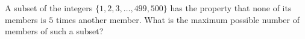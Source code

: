 A subset of the integers $\{1,2,3,\dots,499,500\}$ has the property that none of its members is $5$ times another member. What is the maximum possible number of members of such a subset?
